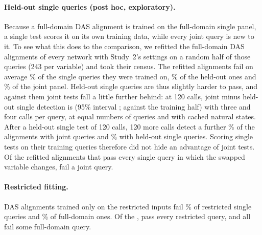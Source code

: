 \paragraph{Held-out single queries (post hoc, exploratory).}
Because a full-domain DAS alignment is trained on the full-domain single panel, a single test scores it on its own
training data, while every joint query is new to it. To see what this does to the comparison, we refitted the
full-domain DAS alignments of every network with Study~2's settings on a random half of those queries (243 per
variable) and took their census. The refitted alignments fail on average \TrnHoTrainRate\% of the single queries they
were trained on, \TrnHoHeldRate\% of the held-out ones and \TrnHoJointRate\% of the joint panel. Held-out single
queries are thus slightly harder to pass, and against them joint tests fall a little further behind: at 120 calls,
joint minus held-out single detection is \TrnHoContrast{} (95\% interval \TrnHoContrastCI; \TrnHoTrainContrast{}
against the training half) with three and four calls per query, \TrnHoEqual{} at equal numbers of queries and
\TrnHoCached{} with cached natural states. After a held-out single test of 120 calls, 120 more calls detect a further
\TrnHoAddonJoint\% of the alignments with joint queries and \TrnHoAddonSingle\% with held-out single queries. Scoring
single tests on their training queries therefore did not hide an advantage of joint tests. Of the \TrnHoPassChanged{}
refitted alignments that pass every single query in which the swapped variable changes, \TrnHoPassBothFailJoint{} fail
a joint query.

\paragraph{Restricted fitting.}
DAS alignments trained only on the restricted inputs fail \TrnCovRestricted\% of restricted single queries and
\TrnCovFull\% of full-domain ones. Of the \TrnCovCandidates, \TrnCovPassRestricted{} pass every restricted query, and
all \TrnCovFailFull{} fail some full-domain query.
